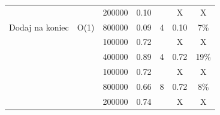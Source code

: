 \documentclass{article}
\begin{document}
\begin{table}[H]
{\begin{tabular}{|ccccccc|}
                \multicolumn{1}{|c|}{} & \multicolumn{1}{c|}{} & \multicolumn{1}{c|}{200000} & \multicolumn{1}{c|}{0.10} & \multicolumn{1}{c|}{} & \multicolumn{1}{c|}{X} & X \\ \cline{3-4} \cline{6-7} 
                \multicolumn{1}{|c|}{\multirow{-6}{*}{Dodaj na koniec}} & \multicolumn{1}{c|}{\multirow{-6}{*}{O(1)}} & \multicolumn{1}{c|}{800000} & \multicolumn{1}{c|}{0.09} & \multicolumn{1}{c|}{\multirow{-2}{*}{4}} & \multicolumn{1}{c|}{0.10} & 7\% \\ \hline
                \rowcolor[HTML]{F4FFF4} 
                \multicolumn{1}{|c|}{\cellcolor[HTML]{F4FFF4}} & \multicolumn{1}{c|}{\cellcolor[HTML]{F4FFF4}} & \multicolumn{1}{c|}{\cellcolor[HTML]{F4FFF4}100000} & \multicolumn{1}{c|}{\cellcolor[HTML]{F4FFF4}0.72} & \multicolumn{1}{c|}{\cellcolor[HTML]{F4FFF4}} & \multicolumn{1}{c|}{\cellcolor[HTML]{F4FFF4}X} & X \\ \cline{3-4} \cline{6-7} 
                \rowcolor[HTML]{F4FFF4} 
                \multicolumn{1}{|c|}{\cellcolor[HTML]{F4FFF4}} & \multicolumn{1}{c|}{\cellcolor[HTML]{F4FFF4}} & \multicolumn{1}{c|}{\cellcolor[HTML]{F4FFF4}400000} & \multicolumn{1}{c|}{\cellcolor[HTML]{F4FFF4}0.89} & \multicolumn{1}{c|}{\multirow{-2}{*}{\cellcolor[HTML]{F4FFF4}4}} & \multicolumn{1}{c|}{\cellcolor[HTML]{F4FFF4}0.72} & 19\% \\ \cline{3-7} 
                \rowcolor[HTML]{F4FFF4} 
                \multicolumn{1}{|c|}{\cellcolor[HTML]{F4FFF4}} & \multicolumn{1}{c|}{\cellcolor[HTML]{F4FFF4}} & \multicolumn{1}{c|}{\cellcolor[HTML]{F4FFF4}100000} & \multicolumn{1}{c|}{\cellcolor[HTML]{F4FFF4}0.72} & \multicolumn{1}{c|}{\cellcolor[HTML]{F4FFF4}} & \multicolumn{1}{c|}{\cellcolor[HTML]{F4FFF4}X} & X \\ \cline{3-4} \cline{6-7} 
                \rowcolor[HTML]{F4FFF4} 
                \multicolumn{1}{|c|}{\cellcolor[HTML]{F4FFF4}} & \multicolumn{1}{c|}{\cellcolor[HTML]{F4FFF4}} & \multicolumn{1}{c|}{\cellcolor[HTML]{F4FFF4}800000} & \multicolumn{1}{c|}{\cellcolor[HTML]{F4FFF4}0.66} & \multicolumn{1}{c|}{\multirow{-2}{*}{\cellcolor[HTML]{F4FFF4}8}} & \multicolumn{1}{c|}{\cellcolor[HTML]{F4FFF4}0.72} & 8\% \\ \cline{3-7} 
                \rowcolor[HTML]{F4FFF4} 
                \multicolumn{1}{|c|}{\cellcolor[HTML]{F4FFF4}} & \multicolumn{1}{c|}{\cellcolor[HTML]{F4FFF4}} & \multicolumn{1}{c|}{\cellcolor[HTML]{F4FFF4}200000} & \multicolumn{1}{c|}{\cellcolor[HTML]{F4FFF4}0.74} & \multicolumn{1}{c|}{\cellcolor[HTML]{F4FFF4}} & \multicolumn{1}{c|}{\cellcolor[HTML]{F4FFF4}X} & X \\ \cline{3-4} \cline{6-7} 

\end{tabular}}
\end{table}
\end{document}
